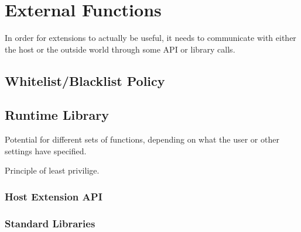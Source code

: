 \chapter {External Functions}

In order for extensions to actually be useful, it needs to communicate with
either the host or the outside world through some API or library calls.


\section {Whitelist/Blacklist Policy}


\section {Runtime Library}

Potential for different sets of functions, depending on what the user or other
settings have specified.

Principle of least privilige.

\subsection {Host Extension API}

\subsection {Standard Libraries}

